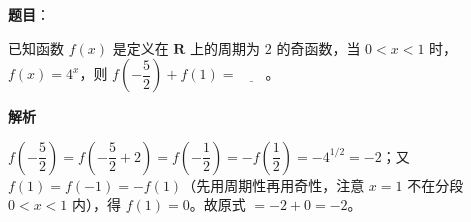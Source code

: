 \begin{answer}

\textbf{题目}：

已知函数 \(f(x)\) 是定义在 \(\mathbf{R}\) 上的周期为 \(2\) 的奇函数，当 \(0<x<1\) 时，\(f(x)=4^{x}\)，则 \(f\left(-\dfrac{5}{2}\right)+f(1)=\underline{\qquad}\)。

\textbf{解析}

\(f\left(-\dfrac{5}{2}\right)=f\left(-\dfrac{5}{2}+2\right)=f\left(-\dfrac{1}{2}\right)=-f\left(\dfrac{1}{2}\right)=-4^{1/2}=-2\)；又 \(f(1)=f(-1)=-f(1)\)（先用周期性再用奇性，注意 \(x=1\) 不在分段 \(0<x<1\) 内），得 \(f(1)=0\)。故原式 \(=-2+0=-2\)。


\end{answer}
